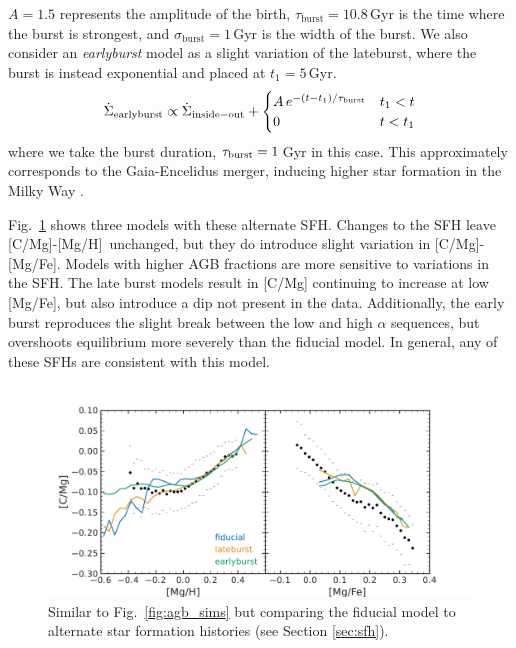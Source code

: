 \documentclass[fleqn,usenatbib]{mnras}
\newcommand{\agb}{AGB}
\newcommand{\sfh}{SFH}
\newcommand{\caah}{[C/Mg]-[Mg/H]}
\newcommand{\caafe}{[C/Mg]-[Mg/Fe]}
\begin{document}
$A=1.5$ represents the amplitude of the birth, $\tau_\text{burst}=10.8$\,Gyr is the time where the burst is strongest, and $\sigma_\text{burst}=1$\,Gyr is the width of the burst.
We also consider an \textit{earlyburst} model as a slight variation of the lateburst, where the burst is instead exponential and placed at $t_1=5$\,Gyr. 
\begin{equation}\label{eq:twoinfall}
    \dot{\Sigma}_{\rm earlyburst} \propto \dot{\Sigma}_{\rm inside-out} + 
\begin{cases}
    A\,e^{-(t-t_1)/\tau_{\rm burst}} & t_1 < t \\
      0 & t<t_1
\end{cases}
\end{equation}
where we take the burst duration, $\tau_{\rm burst}=1$\,Gyr in this case. 
This approximately corresponds to the Gaia-Encelidus merger, inducing higher star formation in the Milky Way \citep{spitoni21, bonaca20, helmi18}.

Fig.~\ref{fig:sfh_models} shows three models with these alternate \sfh{}. Changes to the \sfh{} leave \caah\ unchanged, but they do introduce slight variation in \caafe. Models with higher \agb{} fractions are more sensitive to variations in the \sfh{}. The late burst models result in [C/Mg] continuing to increase at low [Mg/Fe], but also introduce a dip not present in the data. Additionally, the early burst
reproduces the slight break between the low and high $\alpha$ sequences, but overshoots equilibrium more severely than the fiducial model. 
In general, any of these \sfh{}s are consistent with this model.


\begin{figure}
\centering
\includegraphics{lateburst_eta.pdf}

\caption{Similar to Fig.~\ref{fig:agb_sims} but comparing the fiducial model to alternate star formation histories (see Section  \ref{sec:sfh}).}

\label{fig:sfh_models}
\end{figure}
\end{document}
